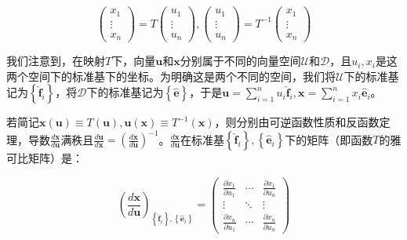 \documentclass[main.tex]{subfiles}
\begin{document}
\begin{equation*}
    \left(\begin{array}{c}x_1\\\vdots\\x_n\end{array}\right)=T\left(\begin{array}{c}u_1\\\vdots\\u_n\end{array}\right),\left(\begin{array}{c}u_1\\\vdots\\u_n\end{array}\right)=T^{-1}\left(\begin{array}{c}x_1\\\vdots\\x_n\end{array}\right)
\end{equation*}

我们注意到，在映射$T$下，向量$\mathbf{u}$和$\mathbf{x}$分别属于不同的向量空间$\mathcal{U}$和$\mathcal{D}$，且$u_i,x_i$是这两个空间下的标准基下的坐标。为明确这是两个不同的空间，我们将$\mathcal{U}$下的标准基记为$\left\{\mathbf{\hat{f}}_i\right\}$，将$\mathcal{D}$下的标准基记为$\left\{\mathbf{\hat{e}}\right\}$，于是$\mathbf{u}=\sum_{i=1}^nu_i\mathbf{\hat{f}}_i,\mathbf{x}=\sum_{i=1}^nx_i\mathbf{\hat{e}}_i$。

若简记$\mathbf{x}\left(\mathbf{u}\right)\equiv T\left(\mathbf{u}\right),\mathbf{u}\left(\mathbf{x}\right)\equiv T^{-1}\left(\mathbf{x}\right)$，则分别由可逆函数性质和反函数定理，导数$\frac{d\mathbf{x}}{d\mathbf{u}}$满秩且$\frac{d\mathbf{u}}{d\mathbf{x}}=\left(\frac{d\mathbf{x}}{d\mathbf{u}}\right)^{-1}$。$\frac{d\mathbf{x}}{d\mathbf{u}}$在标准基$\left\{\mathbf{\hat{f}}_i\right\},\left\{\mathbf{\hat{e}}_i\right\}$下的矩阵（即函数$T$的雅可比矩阵）是：

\[\left(\frac{d\mathbf{x}}{d\mathbf{u}}\right)_{\left\{\mathbf{\hat{f}}_i\right\},\left\{\mathbf{\hat{e}}_i\right\}}=\left(\begin{array}{ccc}
            \frac{\partial x_1}{\partial u_1} & \cdots & \frac{\partial x_1}{\partial u_n} \\
            \vdots                            & \ddots & \vdots                            \\
            \frac{\partial x_n}{\partial u_1} & \cdots & \frac{\partial x_n}{\partial u_n}\end{array}\right)\]
\end{document}
